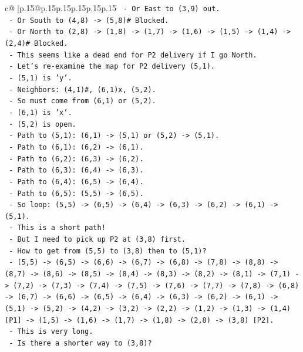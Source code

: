 \documentclass{article}
\begin{document}
{\begin{supertabular}{c@{$\;$}|p{.15\linewidth}@{}p{.15\linewidth}p{.15\linewidth}p{.15\linewidth}p{.15\linewidth}p{.15\linewidth}}
{{{\texttt{  {-} Or East to (3,9) out.} \\
\texttt{  {-} Or South to (4,8) {-}> (5,8)\# Blocked.} \\
\texttt{  {-} Or North to (2,8) {-}> (1,8) {-}> (1,7) {-}> (1,6) {-}> (1,5) {-}> (1,4) {-}> (2,4)\# Blocked.} \\
\texttt{  {-} This seems like a dead end for P2 delivery if I go North.} \\
\texttt{  {-} Let's re{-}examine the map for P2 delivery (5,1).} \\
\texttt{  {-} (5,1) is 'y'.} \\
\texttt{  {-} Neighbors: (4,1)\#, (6,1)x, (5,2).} \\
\texttt{  {-} So must come from (6,1) or (5,2).} \\
\texttt{  {-} (6,1) is 'x'.} \\
\texttt{  {-} (5,2) is open.} \\
\texttt{  {-} Path to (5,1): (6,1) {-}> (5,1) or (5,2) {-}> (5,1).} \\
\texttt{  {-} Path to (6,1): (6,2) {-}> (6,1).} \\
\texttt{  {-} Path to (6,2): (6,3) {-}> (6,2).} \\
\texttt{  {-} Path to (6,3): (6,4) {-}> (6,3).} \\
\texttt{  {-} Path to (6,4): (6,5) {-}> (6,4).} \\
\texttt{  {-} Path to (6,5): (5,5) {-}> (6,5).} \\
\texttt{  {-} So loop: (5,5) {-}> (6,5) {-}> (6,4) {-}> (6,3) {-}> (6,2) {-}> (6,1) {-}> (5,1).} \\
\texttt{  {-} This is a short path!} \\
\texttt{  {-} But I need to pick up P2 at (3,8) first.} \\
\texttt{  {-} How to get from (5,5) to (3,8) then to (5,1)?} \\
\texttt{  {-} (5,5) {-}> (6,5) {-}> (6,6) {-}> (6,7) {-}> (6,8) {-}> (7,8) {-}> (8,8) {-}> (8,7) {-}> (8,6) {-}> (8,5) {-}> (8,4) {-}> (8,3) {-}> (8,2) {-}> (8,1) {-}> (7,1) {-}> (7,2) {-}> (7,3) {-}> (7,4) {-}> (7,5) {-}> (7,6) {-}> (7,7) {-}> (7,8) {-}> (6,8) {-}> (6,7) {-}> (6,6) {-}> (6,5) {-}> (6,4) {-}> (6,3) {-}> (6,2) {-}> (6,1) {-}> (5,1) {-}> (5,2) {-}> (4,2) {-}> (3,2) {-}> (2,2) {-}> (1,2) {-}> (1,3) {-}> (1,4) {[}P1{]} {-}> (1,5) {-}> (1,6) {-}> (1,7) {-}> (1,8) {-}> (2,8) {-}> (3,8) {[}P2{]}.} \\
\texttt{  {-} This is very long.} \\
\texttt{  {-} Is there a shorter way to (3,8)?} \\
}}}
\end{supertabular}}
\end{document}

